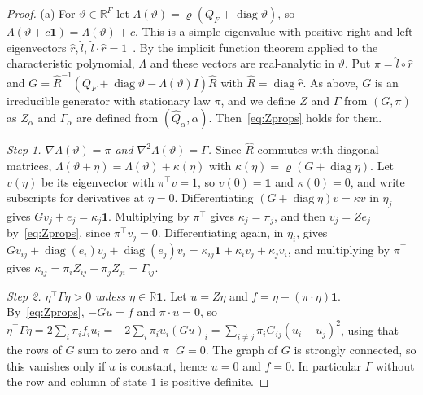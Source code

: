 \begin{proof}
(a) For $\vartheta\in\mathbb R^F$ let
$\Lambda(\vartheta)=\varrho(Q_F+\operatorname{diag}\vartheta)$, so
$\Lambda(\vartheta+c\mathbf 1)=\Lambda(\vartheta)+c$. This is a simple
eigenvalue with positive right and left eigenvectors $\hat r,\hat l$,
$\hat l\cdot\hat r=1$~\cite{bermanplemmons1994}. By the implicit function
theorem applied to the characteristic polynomial, $\Lambda$ and these vectors
are real-analytic in $\vartheta$. Put $\pi=\hat l\circ\hat r$ and
$G=\hat R^{-1}(Q_F+\operatorname{diag}\vartheta-\Lambda(\vartheta)I)\hat R$
with $\hat R=\operatorname{diag}\hat r$. As above, $G$ is an irreducible
generator with stationary law $\pi$, and we define $Z$ and $\Gamma$ from
$(G,\pi)$ as $Z_\alpha$ and $\Gamma_\alpha$ are defined from
$(\widehat Q_\alpha,\alpha)$. Then~\eqref{eq:Zprops} holds for them.

\emph{Step 1. $\nabla\Lambda(\vartheta)=\pi$ and
$\nabla^2\Lambda(\vartheta)=\Gamma$.} Since $\hat R$ commutes with diagonal
matrices, $\Lambda(\vartheta+\eta)=\Lambda(\vartheta)+\kappa(\eta)$ with
$\kappa(\eta)=\varrho(G+\operatorname{diag}\eta)$. Let $v(\eta)$ be its
eigenvector with $\pi^\top v=1$, so $v(0)=\mathbf 1$ and $\kappa(0)=0$, and
write subscripts for derivatives at $\eta=0$. Differentiating
$(G+\operatorname{diag}\eta)v=\kappa v$ in $\eta_j$ gives
$Gv_j+e_j=\kappa_j\mathbf 1$. Multiplying by $\pi^\top$ gives
$\kappa_j=\pi_j$, and then $v_j=Ze_j$ by~\eqref{eq:Zprops}, since
$\pi^\top v_j=0$. Differentiating again, in $\eta_i$, gives
$Gv_{ij}+\operatorname{diag}(e_i)v_j+\operatorname{diag}(e_j)v_i
=\kappa_{ij}\mathbf 1+\kappa_iv_j+\kappa_jv_i$, and multiplying by $\pi^\top$
gives $\kappa_{ij}=\pi_iZ_{ij}+\pi_jZ_{ji}=\Gamma_{ij}$.

\emph{Step 2. $\eta^\top\Gamma\eta>0$ unless $\eta\in\mathbb R\mathbf 1$.} Let
$u=Z\eta$ and $f=\eta-(\pi\cdot\eta)\mathbf 1$. By~\eqref{eq:Zprops},
$-Gu=f$ and $\pi\cdot u=0$, so
$\eta^\top\Gamma\eta=2\sum_i\pi_if_iu_i=-2\sum_i\pi_iu_i(Gu)_i
=\sum_{i\ne j}\pi_iG_{ij}(u_i-u_j)^2$, using that the rows of $G$ sum to
zero and $\pi^\top G=0$. The graph of $G$ is strongly connected, so this
vanishes only if $u$ is constant, hence $u=0$ and $f=0$. In particular
$\Gamma$ without the row and column of state $1$ is positive definite.


\end{proof}
